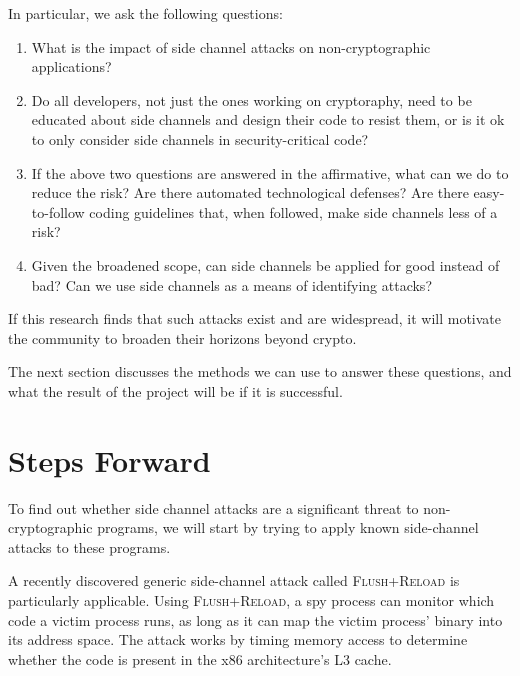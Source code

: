 \documentclass{acm_proc_article-sp}
\begin{document}
In particular, we ask the following questions:

\begin{enumerate}
\item What is the impact of side channel attacks on non-cryptographic
      applications?

\item Do all developers, not just the ones working on cryptoraphy, need to be
      educated about side channels and design their code to resist them, or is
      it ok to only consider side channels in security-critical code?

\item If the above two questions are answered in the affirmative, what can we do
      to reduce the risk? Are there automated technological defenses? Are there
      easy-to-follow coding guidelines that, when followed, make side channels
      less of a risk?

\item Given the broadened scope, can side channels be applied for good instead
      of bad? Can we use side channels as a means of identifying attacks?
\end{enumerate}

If this research finds that such attacks exist and are widespread, it will
motivate the community to broaden their horizons beyond crypto.

The next section discusses the methods we can use to answer these questions, and
what the result of the project will be if it is successful.

\section{Steps Forward}

% 
% 

To find out whether side channel attacks are a significant threat to
non-cryptographic programs, we will start by trying to apply known side-channel
attacks to these programs.

A recently discovered generic side-channel attack called \textsc{Flush+Reload}
\cite{yarom2013flush} is particularly applicable. Using \textsc{Flush+Reload},
a spy process can monitor which code a victim process runs, as long as it can
map the victim process' binary into its address space. The attack works by
timing memory access to determine whether the code is present in the x86
architecture's L3 cache.
\end{document}
